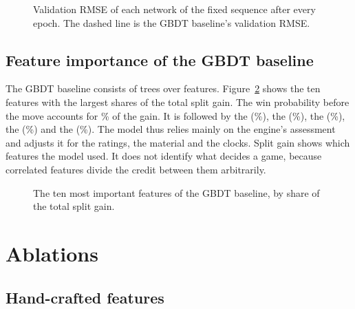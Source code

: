 \documentclass[11pt]{article}
\begin{document}
\begin{figure}[htbp]\centering
{}
\caption{Validation RMSE of each network of the fixed sequence after every
epoch. The dashed line is the GBDT baseline's validation RMSE.}
\label{fig:curves}
\end{figure}

\subsection{Feature importance of the GBDT baseline}
\label{sec:importance}

The GBDT baseline consists of  trees over
 features. Figure~\ref{fig:leans} shows the ten
features with the largest shares of the total split gain. The win probability
before the move accounts for \% of the gain. It is
followed by the 
(\%), the 
(\%), the 
(\%), the 
(\%) and the 
(\%). The model thus relies mainly on the engine's
assessment and adjusts it for the ratings, the material and the clocks. Split
gain shows which features the model used. It does not identify what decides a
game, because correlated features divide the credit between them arbitrarily.

\begin{figure}[htbp]\centering
{}
\caption{The ten most important features of the GBDT baseline, by share of
the total split gain.}
\label{fig:leans}
\end{figure}

\ifchanges
\section{Ablations}
\label{sec:ablations}



\ifchangehand
\subsection{Hand-crafted features}
\end{document}
